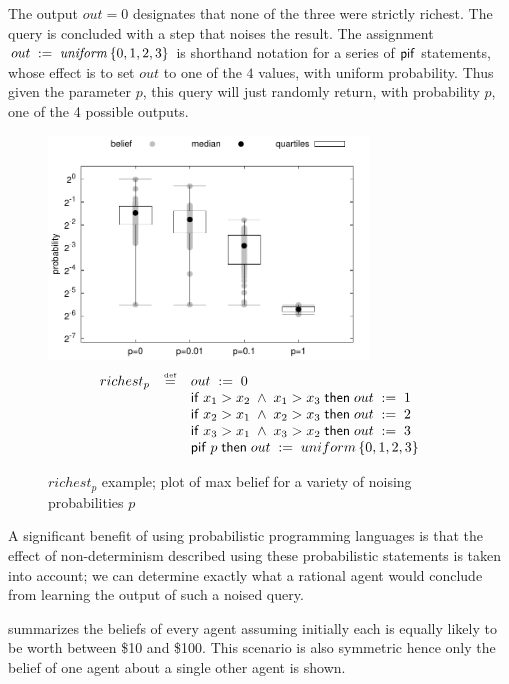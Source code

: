 \documentclass[10pt]{sigplanconf}
\begin{document}
The output $ out = 0 $ designates that none of the three were strictly
richest. The query is concluded with a step that noises the
result. The assignment $ {out}\;:=\;{\mathit{uniform}\left\{ 0,1,2,3 \right\}} $ is
shorthand notation for a series of $ \mathsf{pif} $ statements, whose effect
is to set $ out $ to one of the $ 4 $ values, with uniform
probability. Thus given the parameter $ p $, this query will just
randomly return, with probability $ p $, one of the 4 possible
outputs.

\begin{figure}[t]
\centering
\includegraphics[width=8.5cm]{figures/beliefs_million.pdf}
$$ \begin{array}{lcl}
richest_p & \stackrel{\smash{\scriptscriptstyle \mathrm{def}}}= & {out}\;:=\;{0} \\
&& \mathsf{if}\; x_1 > x_2 \; \wedge \; x_1 > x_3 \; \mathsf{then} \; {out}\;:=\;{1} \\
&& \mathsf{if}\; x_2 > x_1 \; \wedge \; x_2 > x_3 \; \mathsf{then} \; {out}\;:=\;{2} \\
&& \mathsf{if}\; x_3 > x_1 \; \wedge \; x_3 > x_2 \; \mathsf{then} \; {out}\;:=\;{3} \\
&& \mathsf{pif}\; p \; \mathsf{then} \; {out}\;:=\;{uniform\left\{ 0,1,2,3 \right\}}
\end{array} $$
\vspace*{-0.1in}
\caption{$ richest_{p} $ example; plot of max belief for a variety of
noising probabilities $ p $} \label{fig:million}
\end{figure}

A significant benefit of using probabilistic programming languages is
that the effect of non-determinism described using these probabilistic
statements is taken into account; we can determine exactly what a
rational agent would conclude from learning the output of such a
noised query.

 summarizes the beliefs of every agent assuming
initially each is equally likely to be worth between \$10 and
\$100. This scenario is also symmetric hence only the belief of one
agent about a single other agent is shown.
\end{document}
